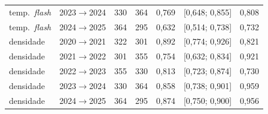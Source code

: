 {\begin{xltabular}{\linewidth}{@{}llrrrlr@{}}
temp.\ \emph{flash} & 2023$\to$2024 & 330 & 364 & 0,769 & [0,648; 0,855] & 0,808 \\
temp.\ \emph{flash} & 2024$\to$2025 & 364 & 295 & 0,632 & [0,514; 0,738] & 0,732 \\
densidade & 2020$\to$2021 & 322 & 301 & 0,892 & [0,774; 0,926] & 0,821 \\
densidade & 2021$\to$2022 & 301 & 355 & 0,754 & [0,632; 0,834] & 0,921 \\
densidade & 2022$\to$2023 & 355 & 330 & 0,813 & [0,723; 0,874] & 0,730 \\
densidade & 2023$\to$2024 & 330 & 364 & 0,858 & [0,738; 0,901] & 0,959 \\
densidade & 2024$\to$2025 & 364 & 295 & 0,874 & [0,750; 0,900] & 0,956 \\
\end{xltabular}
}
